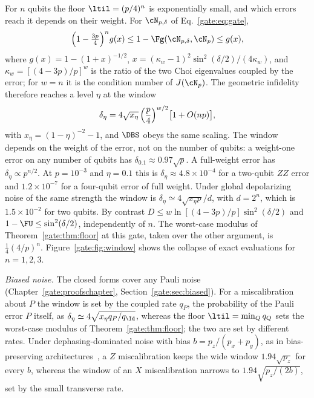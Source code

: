 For $n$ qubits the floor $\ltil=(p/4)^n$ is exponentially small, and which errors reach it depends on their weight. For $\cN_{p,\delta}$ of Eq.~\eqref{gate:eq:gate},
\begin{equation}\label{gate:eq:window}
\Bigl(1-\tfrac{3p}{4}\Bigr)^{n}g(x)\le1-\Fg(\cN_{p,\delta},\cN_p)\le g(x),
\end{equation}
where $g(x)=1-(1+x)^{-1/2}$, $x=(\kappa_w-1)^2\sin^2(\delta/2)/(4\kappa_w)$, and $\kappa_w=[(4-3p)/p]^w$ is the ratio of the two Choi eigenvalues coupled by the error; for $w=n$ it is the condition number of $J(\cN_p)$. The geometric infidelity therefore reaches a level $\eta$ at the window
\begin{equation}\label{gate:eq:delta}
\delta_\eta=4\sqrt{x_\eta}\,\Bigl(\frac p4\Bigr)^{w/2}\bigl[1+O(np)\bigr],
\end{equation}
with $x_\eta=(1-\eta)^{-2}-1$, and $\DBS$ obeys the same scaling. The window depends on the weight of the error, not on the number of qubits: a weight-one error on any number of qubits has $\delta_{0.1}\approx0.97\sqrt p$. A full-weight error has $\delta_\eta\propto p^{n/2}$. At $p=10^{-3}$ and $\eta=0.1$ this is $\delta_\eta\approx4.8\times10^{-4}$ for a two-qubit $ZZ$ error and $1.2\times10^{-7}$ for a four-qubit error of full weight. Under global depolarizing noise of the same strength the window is $\delta_\eta\simeq4\sqrt{x_\eta p}/d$, with $d=2^n$, which is $1.5\times10^{-2}$ for two qubits. By contrast $D\le w\ln[(4-3p)/p]\sin^2(\delta/2)$ and $1-\FU\le\sin^2(\delta/2)$, independently of $n$. The worst-case modulus of Theorem~\ref{gate:thm:floor} at this gate, taken over the other argument, is $\frac14(4/p)^n$. Figure~\ref{gate:fig:window} shows the collapse of exact evaluations for $n=1,2,3$.

\emph{Biased noise.} The closed forms cover any Pauli noise (Chapter~\ref{gate:proofschapter}, Section~\ref{gate:sec:biased}). For a miscalibration about $P$ the window is set by the coupled rate $q_P$, the probability of the Pauli error $P$ itself, as $\delta_\eta\simeq4\sqrt{x_\eta q_P/q_{\Id}}$, whereas the floor $\ltil=\min_Qq_Q$ sets the worst-case modulus of Theorem~\ref{gate:thm:floor}; the two are set by different rates. Under dephasing-dominated noise with bias $b=p_z/(p_x+p_y)$, as in bias-preserving architectures~\cite{Tuckett2018,Puri2020}, a $Z$ miscalibration keeps the wide window $1.94\sqrt{p_z}$ for every $b$, whereas the window of an $X$ miscalibration narrows to $1.94\sqrt{p_z/(2b)}$, set by the small transverse rate.

